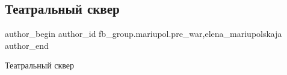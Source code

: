  
 
 
 
 

\subsection{Театральный сквер}
\label{sec:11_02_2023.fb.fb_group.mariupol.pre_war.10.teatralnii_skver}
 
\ifcmt
 author_begin
   author_id fb_group.mariupol.pre_war,elena_mariupolskaja
 author_end
\fi

Театральный сквер
